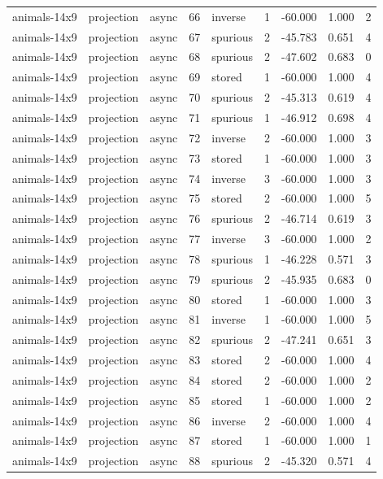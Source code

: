 \begin{tabular}{lllrlrrrr}
animals-14x9 & projection & async & 66 & inverse & 1 & -60.000 & 1.000 & 2 \\
animals-14x9 & projection & async & 67 & spurious & 2 & -45.783 & 0.651 & 4 \\
animals-14x9 & projection & async & 68 & spurious & 2 & -47.602 & 0.683 & 0 \\
animals-14x9 & projection & async & 69 & stored & 1 & -60.000 & 1.000 & 4 \\
animals-14x9 & projection & async & 70 & spurious & 2 & -45.313 & 0.619 & 4 \\
animals-14x9 & projection & async & 71 & spurious & 1 & -46.912 & 0.698 & 4 \\
animals-14x9 & projection & async & 72 & inverse & 2 & -60.000 & 1.000 & 3 \\
animals-14x9 & projection & async & 73 & stored & 1 & -60.000 & 1.000 & 3 \\
animals-14x9 & projection & async & 74 & inverse & 3 & -60.000 & 1.000 & 3 \\
animals-14x9 & projection & async & 75 & stored & 2 & -60.000 & 1.000 & 5 \\
animals-14x9 & projection & async & 76 & spurious & 2 & -46.714 & 0.619 & 3 \\
animals-14x9 & projection & async & 77 & inverse & 3 & -60.000 & 1.000 & 2 \\
animals-14x9 & projection & async & 78 & spurious & 1 & -46.228 & 0.571 & 3 \\
animals-14x9 & projection & async & 79 & spurious & 2 & -45.935 & 0.683 & 0 \\
animals-14x9 & projection & async & 80 & stored & 1 & -60.000 & 1.000 & 3 \\
animals-14x9 & projection & async & 81 & inverse & 1 & -60.000 & 1.000 & 5 \\
animals-14x9 & projection & async & 82 & spurious & 2 & -47.241 & 0.651 & 3 \\
animals-14x9 & projection & async & 83 & stored & 2 & -60.000 & 1.000 & 4 \\
animals-14x9 & projection & async & 84 & stored & 2 & -60.000 & 1.000 & 2 \\
animals-14x9 & projection & async & 85 & stored & 1 & -60.000 & 1.000 & 2 \\
animals-14x9 & projection & async & 86 & inverse & 2 & -60.000 & 1.000 & 4 \\
animals-14x9 & projection & async & 87 & stored & 1 & -60.000 & 1.000 & 1 \\
animals-14x9 & projection & async & 88 & spurious & 2 & -45.320 & 0.571 & 4 \\

\end{tabular}

